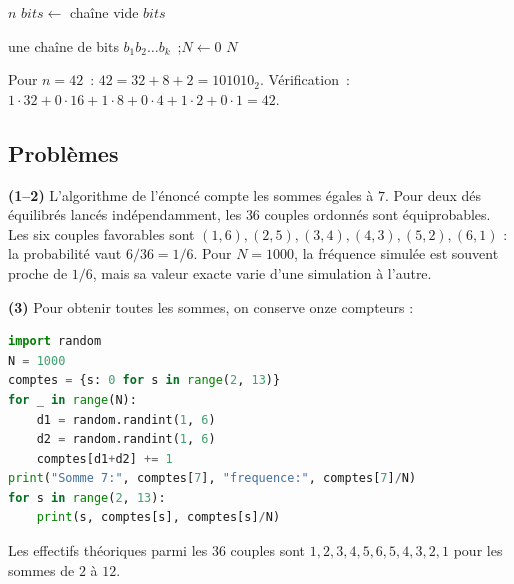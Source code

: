
\begin{algorithm}[H]
\caption{D\'ecimal vers binaire}
\Lire $n$\;
$\mathit{bits} \leftarrow$ cha\^ine vide\;
\Afficher $\mathit{bits}$\;
\end{algorithm}

\begin{algorithm}[H]
\caption{Binaire vers d\'ecimal}
\Lire une cha\^ine de bits $b_1b_2\ldots b_k$~;\quad $N \leftarrow 0$\;
\Afficher $N$\;
\end{algorithm}

Pour $n=42$~: $42=32+8+2=101010_2$.
V\'erification~: $1\cdot32+0\cdot16+1\cdot8+0\cdot4+1\cdot2+0\cdot1=42$.\checkmark

\subsection*{Probl\`emes}


\textbf{(1--2)} L'algorithme de l'\'enonc\'e compte les sommes \'egales \`a $7$.
Pour deux d\'es \'equilibr\'es lanc\'es ind\'ependamment, les $36$ couples ordonn\'es
sont \'equiprobables. Les six couples favorables sont
$(1,6),(2,5),(3,4),(4,3),(5,2),(6,1)$ : la probabilit\'e vaut $6/36=1/6$.
Pour $N=1000$, la fr\'equence simul\'ee est souvent proche de $1/6$,
mais sa valeur exacte varie d'une simulation \`a l'autre.

\textbf{(3)} Pour obtenir toutes les sommes, on conserve onze compteurs :
\begin{lstlisting}[language=Python]
import random
N = 1000
comptes = {s: 0 for s in range(2, 13)}
for _ in range(N):
    d1 = random.randint(1, 6)
    d2 = random.randint(1, 6)
    comptes[d1+d2] += 1
print("Somme 7:", comptes[7], "frequence:", comptes[7]/N)
for s in range(2, 13):
    print(s, comptes[s], comptes[s]/N)
\end{lstlisting}
Les effectifs th\'eoriques parmi les $36$ couples sont
$1,2,3,4,5,6,5,4,3,2,1$ pour les sommes de $2$ \`a $12$.



